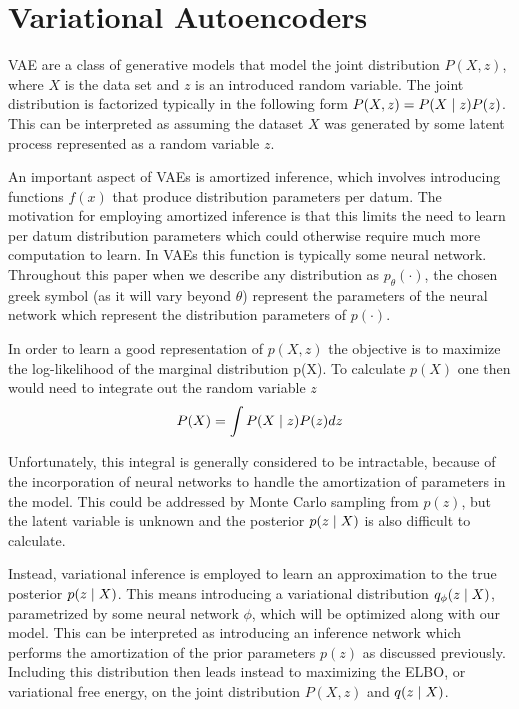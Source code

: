 \section{Variational Autoencoders}

\ac{VAE} are a class of generative models that model the joint distribution $P(X, z)$, where $X$ is the data set and $z$ is an introduced random variable. The joint distribution is factorized typically in the following form $P(X, z) = P(X\; | \;{z})P(z)$. This can be interpreted as assuming the dataset $X$ was generated by some latent process represented as a random variable $z$. 

An important aspect of \ac{VAE}s is amortized inference, which involves introducing functions $f(x)$ that produce distribution parameters per datum. The motivation for employing amortized inference is that this limits the need to learn per datum distribution parameters which could otherwise require much more computation to learn. In \ac{VAE}s this function is typically some neural network. Throughout this paper when we describe any distribution as $p_{\theta}(\cdot)$, the chosen greek symbol (as it will vary beyond $\theta$) represent the parameters of the neural network which represent the distribution parameters of $p(\cdot)$. 

In order to learn a good representation of $p(X,z)$ the objective is to maximize the log-likelihood of the marginal distribution p(X). To calculate $p(X)$ one then would need to integrate out the random variable $z$
\begin{equation}
P(X) = \int P(X \; | \;{z}) P(z) dz
\end{equation}

Unfortunately, this integral is generally considered to be intractable, because of the incorporation of neural networks to handle the amortization of parameters in the model. This could be addressed by Monte Carlo sampling from $p(z)$, but the latent variable is unknown and the posterior $p(z \; | \;{X})$ is also difficult to calculate. 

Instead, variational inference is employed to learn an approximation to the true posterior $p(z \; | \;{X})$. This means introducing a variational distribution $q_{\phi}(z \; | \;{X})$, parametrized by some neural network $\phi$, which will be optimized along with our model. This can be interpreted as introducing an inference network which performs the amortization of the prior parameters $p(z)$ as discussed previously.  Including this distribution then leads instead to maximizing the \ac{ELBO}, or variational free energy, on the joint distribution $P(X, z)$ and $q(z \; | \;{X})$. 

